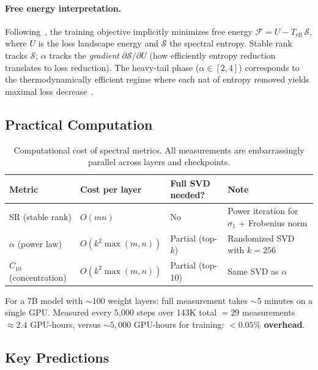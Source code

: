 \paragraph{Free energy interpretation.}
Following~\citet{sadrtdinov2025}, the training objective implicitly minimizes free energy $\mathcal{F} = U - T_{\mathrm{eff}}\,\mathcal{S}$, where $U$ is the loss landscape energy and $\mathcal{S}$ the spectral entropy. Stable rank tracks $\mathcal{S}$; $\alpha$ tracks the \emph{gradient} $\partial \mathcal{S}/\partial U$ (how efficiently entropy reduction translates to loss reduction). The heavy-tail phase ($\alpha \in [2,4]$) corresponds to the thermodynamically efficient regime where each nat of entropy removed yields maximal loss decrease~\citep{liu_ziyin_neurips2025, freedman2026}.

\subsection{Practical Computation}
\label{sec:computation}

\begin{table}[t]
\centering
\small
\caption{Computational cost of spectral metrics. All measurements are embarrassingly parallel across layers and checkpoints.}
\label{tab:cost}
\begin{tabular}{@{}lllp{5cm}@{}}
\toprule
\textbf{Metric} & \textbf{Cost per layer} & \textbf{Full SVD needed?} & \textbf{Note} \\
\midrule
SR (stable rank) & $O(mn)$ & No & Power iteration for $\sigma_1$ + Frobenius norm \\
$\alpha$ (power law) & $O(k^2 \max(m,n))$ & Partial (top-$k$) & Randomized SVD with $k\!=\!256$ \\
$C_{10}$ (concentration) & $O(k^2 \max(m,n))$ & Partial (top-10) & Same SVD as $\alpha$ \\
\bottomrule
\end{tabular}
\end{table}

For a 7B model with ${\sim}100$ weight layers: full measurement takes ${\sim}5$ minutes on a single GPU. Measured every 5{,}000 steps over 143K total $= 29$ measurements $\approx 2.4$ GPU-hours, versus ${\sim}5{,}000$ GPU-hours for training: \textbf{$<0.05\%$ overhead}.

\subsection{Key Predictions}
\label{sec:predictions}


